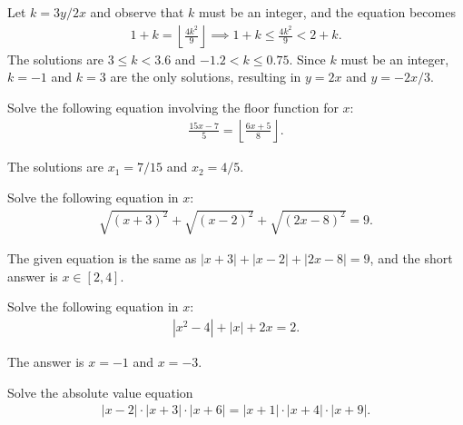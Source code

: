 \begin{solution}
    Let $k=3y/2x$ and observe that $k$ must be an integer, and the equation becomes
    \begin{align*}
        1+k = \left\lfloor \frac{4k^2}{9}\right\rfloor \implies 1+k \leq \frac{4k^2}{9} < 2+k.
    \end{align*}
    The solutions are $3\leq k <3.6$ and $-1.2 < k \leq 0.75$. Since $k$ must be an integer, $k=-1$ and $k=3$ are the only solutions, resulting in $y=2x$ and $y=-2x/3$.
\end{solution}


\begin{question}
    Solve the following equation involving the floor function for $x$:
    \begin{align*}
        \frac{15x-7}{5} = \left\lfloor \frac{6x+5}{8}\right\rfloor.
    \end{align*}
\end{question}

\begin{solution}
    The solutions are $x_1=7/15$ and $x_2=4/5$.
\end{solution}


\begin{question}
    Solve the following equation in $x$:
    \begin{align*}
        \sqrt{(x+3)^2}+\sqrt{(x-2)^2} + \sqrt{(2x-8)^2}=9.
    \end{align*}
\end{question}

\begin{solution}
    The given equation is the same as $|x+3|+|x-2|+|2x-8|=9$, and the short answer is $x\in [2,4]$.
\end{solution}


\begin{question}
    Solve the following equation in $x$:
    \begin{align*}
        |x^2-4|+|x|+2x=2.
    \end{align*}
\end{question}

\begin{solution}
    The answer is $x=-1$ and $x=-3$.
\end{solution}


\begin{question}
    Solve the absolute value equation
    \begin{align*}
        |x-2| \cdot |x+3| \cdot |x+6| = |x+1| \cdot |x+4| \cdot |x+9|.
    \end{align*}
\end{question}

